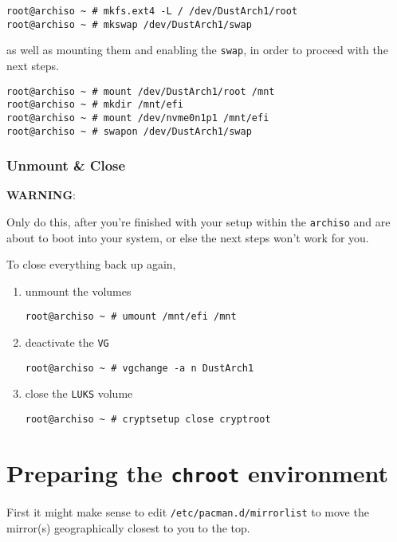 \documentclass[9pt]{report}
\newcommand{\admonition}[2]{\textbf{#1}: {#2}}
\begin{document}
\begin{verbatim}
root@archiso ~ # mkfs.ext4 -L / /dev/DustArch1/root
root@archiso ~ # mkswap /dev/DustArch1/swap
\end{verbatim}

as well as mounting them and enabling the \texttt{swap}, in order to proceed with the next steps.


\begin{verbatim}
root@archiso ~ # mount /dev/DustArch1/root /mnt
root@archiso ~ # mkdir /mnt/efi
root@archiso ~ # mount /dev/nvme0n1p1 /mnt/efi
root@archiso ~ # swapon /dev/DustArch1/swap
\end{verbatim}


\vfill\eject

\hypertarget{x-unmount-and-close}{\subsubsection{Unmount \& Close}}
\admonition{WARNING}{Only do this, after you’re finished with your setup within the \texttt{archiso} and are about to boot into your system, or else the next steps won’t work for you.

}
To close everything back up again,


\begin{enumerate}

\item{unmount the volumes}

\begin{verbatim}
root@archiso ~ # umount /mnt/efi /mnt
\end{verbatim}
\item{deactivate the \texttt{VG}}

\begin{verbatim}
root@archiso ~ # vgchange -a n DustArch1
\end{verbatim}
\item{close the \texttt{LUKS} volume}

\begin{verbatim}
root@archiso ~ # cryptsetup close cryptroot
\end{verbatim}
\end{enumerate}



\vfill\eject

\hypertarget{x-preparing-the-chroot-environment}{\section{Preparing the \texttt{chroot} environment}}
First it might make sense to edit \texttt{/etc/pacman.d/mirrorlist} to move the mirror(s) geographically closest to you to the top.
\end{document}
